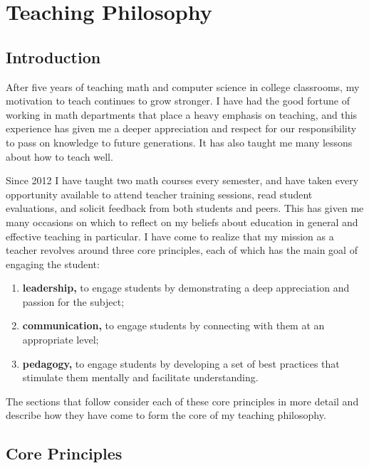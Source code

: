 \section{Teaching Philosophy}
\subsection{Introduction}
After five years of teaching math and computer science in college classrooms, my motivation
to teach continues to grow stronger. I have had the good fortune of working in math departments
that place a heavy emphasis on teaching, and this experience has given me 
a deeper appreciation and respect for our responsibility to pass on knowledge to
future generations. It has also taught me many lessons about how to teach well.
 
Since 2012 I have taught two math courses every semester, and have
taken every opportunity available to attend teacher
training sessions, read student evaluations, and solicit feedback from
both students and peers.  This has given me many occasions on which to
reflect on my beliefs about education in general and effective
teaching in particular.  I have come to realize that my mission as a
teacher revolves around three core principles, each of which has the
main goal of engaging the student:
\begin{enumerate}
\item {\bf leadership,} to engage students by
  demonstrating a deep appreciation and passion for the subject;
\item {\bf communication,} to engage students by connecting with them
  at an appropriate level;
\item {\bf pedagogy,} to engage students by developing a set of best
  practices that stimulate them mentally and facilitate
  understanding.
\end{enumerate}

The sections that follow consider each of these core
principles in more detail and describe how they have come to form the
 core of my teaching philosophy.

 \subsection{Core Principles}

